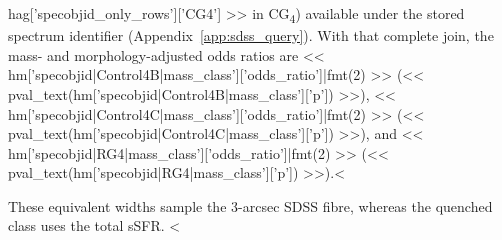 \documentclass{aa}
\newcommand{\CC}{Control\textsubscript{4C}}
\newcommand{\CG}{CG\textsubscript{4}}
\newcommand{\msun}{\mathrm{M}_\odot}
\begin{document}
hag['specobjid_only_rows']['CG4'] >> in \CG{}) available under the stored spectrum identifier (Appendix~\ref{app:sdss_query}). With that complete join, the mass- and morphology-adjusted odds ratios are << hm['specobjid|Control4B|mass_class']['odds_ratio']|fmt(2) >> (<< pval_text(hm['specobjid|Control4B|mass_class']['p']) >>), << hm['specobjid|Control4C|mass_class']['odds_ratio']|fmt(2) >> (<< pval_text(hm['specobjid|Control4C|mass_class']['p']) >>), and << hm['specobjid|RG4|mass_class']['odds_ratio']|fmt(2) >> (<< pval_text(hm['specobjid|RG4|mass_class']['p']) >>).<%

These equivalent widths sample the 3-arcsec SDSS fibre, whereas the quenched class uses the total sSFR. <%
\end{document}
